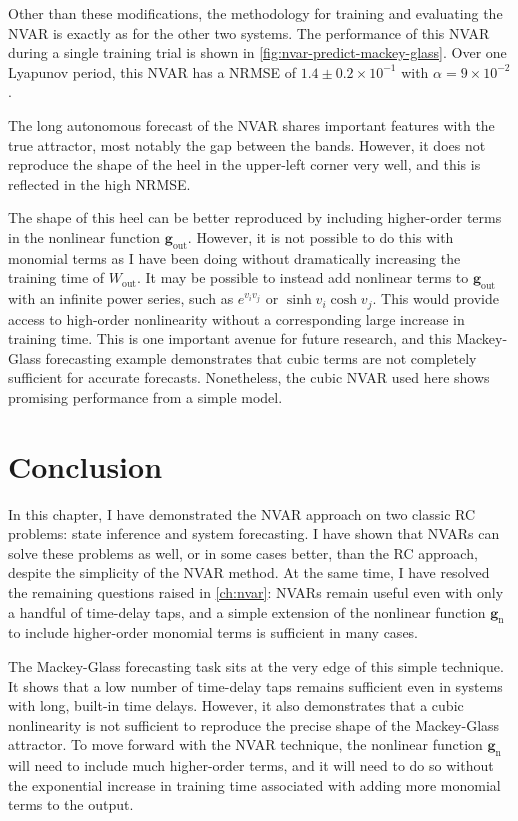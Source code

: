 Other than these modifications, the methodology for training and
evaluating the NVAR is exactly as for the other two systems. The
performance of this NVAR during a single training trial is shown in
\cref{fig:nvar-predict-mackey-glass}. Over one Lyapunov period, this
NVAR has a NRMSE of $1.4\pm0.2\times10^{-1}$ with $\alpha =
9\times10^{-2}$.

The long autonomous forecast of the NVAR shares important features
with the true attractor, most notably the gap between the
bands. However, it does not reproduce the shape of the heel in the
upper-left corner very well, and this is reflected in the high NRMSE.


The shape of this heel can be better reproduced by including
higher-order terms in the nonlinear function
$\bm{g}_\text{out}$. However, it is not possible to do this with
monomial terms as I have been doing without dramatically increasing
the training time of $W_\text{out}$. It may be possible to instead add
nonlinear terms to $\bm{g}_\text{out}$ with an infinite power series,
such as $e^{v_iv_j}$ or $\sinh{v_i}\cosh{v_j}$. This would provide
access to high-order nonlinearity without a corresponding large increase in training
time. This is one important avenue for future research, and this
Mackey-Glass forecasting example demonstrates that cubic terms are not
completely sufficient for accurate forecasts. Nonetheless, the cubic
NVAR used here shows promising performance from a simple model.


\section{Conclusion}

In this chapter, I have demonstrated the NVAR approach on two classic
RC problems: state inference and system forecasting. I have shown that
NVARs can solve these problems as well, or in some cases better, than
the RC approach, despite the simplicity of the NVAR method. At the
same time, I have resolved the remaining questions raised in
\cref{ch:nvar}: NVARs remain useful even with only a handful of
time-delay taps, and a simple extension of the nonlinear function
$\bm{g}_\text{n}$ to include higher-order monomial terms is sufficient
in many cases.

The Mackey-Glass forecasting task sits at the very edge of this simple
technique. It shows that a low number of time-delay taps remains
sufficient even in systems with long, built-in time delays. However,
it also demonstrates that a cubic nonlinearity is not sufficient to
reproduce the precise shape of the Mackey-Glass attractor. To move
forward with the NVAR technique, the nonlinear function
$\bm{g}_\text{n}$ will need to include much higher-order terms, and it
will need to do so without the exponential increase in training time
associated with adding more monomial terms to the output.

